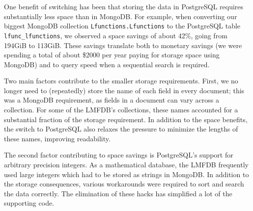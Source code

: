 \documentclass{amsart}
\begin{document}
One benefit of switching has been that storing the data in PostgreSQL requires substantially less space than in MongoDB.
For example, when converting our biggest MongoDB collection \texttt{Lfunctions.Lfunctions} to the PostgreSQL table \texttt{lfunc\_lfunctions}, we observed a space savings of about 42\%, going from 194GiB to 113GiB.
These savings translate both to monetary savings (we were spending a total of about \$2000 per year paying for storage space using MongoDB) and to query speed when a sequential search is required.



Two main factors contribute to the smaller storage requirements.
First, we no longer need to (repeatedly) store the name of each field in every document; this was a MongoDB requirement, as fields in a document can vary across a collection.
For some of the LMFDB's collections, these names accounted for a substantial fraction of the storage requirement.
In addition to the space benefits, the switch to PostgreSQL also relaxes the pressure to minimize the lengths of these names, improving readability.

The second factor contributing to space savings is PostgreSQL's support for arbitrary precision integers.
As a mathematical database, the LMFDB frequently used large integers which had to be stored as strings in MongoDB.
In addition to the storage consequences, various workarounds were required to sort and search the data correctly.
The elimination of these hacks has simplified a lot of the supporting code.
\end{document}
